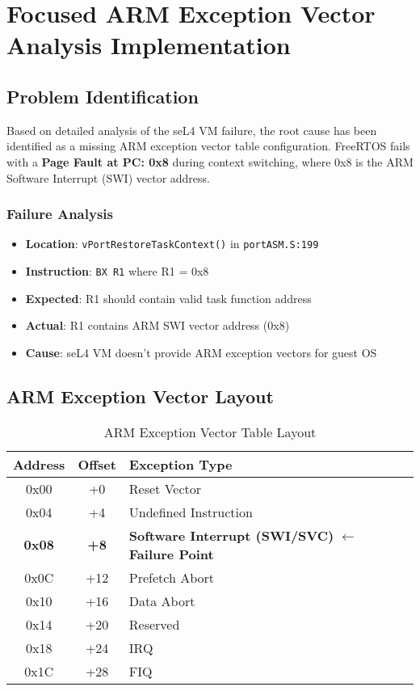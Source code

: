 \documentclass[11pt,a4paper]{article}
\begin{document}
\section{Focused ARM Exception Vector Analysis Implementation}

\subsection{Problem Identification}

Based on detailed analysis of the seL4 VM failure, the root cause has been identified as a missing ARM exception vector table configuration. FreeRTOS fails with a \textbf{Page Fault at PC: 0x8} during context switching, where 0x8 is the ARM Software Interrupt (SWI) vector address.

\subsubsection{Failure Analysis}
\begin{itemize}
    \item \textbf{Location}: \texttt{vPortRestoreTaskContext()} in \texttt{portASM.S:199}
    \item \textbf{Instruction}: \texttt{BX R1} where R1 = 0x8
    \item \textbf{Expected}: R1 should contain valid task function address
    \item \textbf{Actual}: R1 contains ARM SWI vector address (0x8)
    \item \textbf{Cause}: seL4 VM doesn't provide ARM exception vectors for guest OS
\end{itemize}

\subsection{ARM Exception Vector Layout}
\begin{table}[h]
\centering
\begin{tabular}{|c|c|l|}
\hline
\textbf{Address} & \textbf{Offset} & \textbf{Exception Type} \\
\hline
0x00 & +0 & Reset Vector \\
0x04 & +4 & Undefined Instruction \\
\textbf{0x08} & \textbf{+8} & \textbf{Software Interrupt (SWI/SVC)} $\leftarrow$ \textbf{Failure Point} \\
0x0C & +12 & Prefetch Abort \\
0x10 & +16 & Data Abort \\
0x14 & +20 & Reserved \\
0x18 & +24 & IRQ \\
0x1C & +28 & FIQ \\
\hline
\end{tabular}
\caption{ARM Exception Vector Table Layout}
\end{table}
\end{document}
